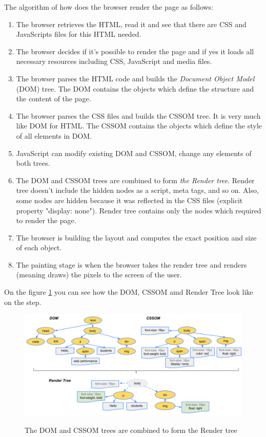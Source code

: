 The algorithm of how does the browser render the page as follows:

\begin{enumerate}
    \item The browser retrieves the HTML, read it and see that there are CSS and JavaScripts files for this HTML needed.
    \item The browser decides if it's possible to render the page and if yes it loads all necessary resources including CSS, JavaScript and media files.
    \item The browser parses the HTML code and builds the \textit{Document Object Model} (DOM) tree. The DOM contains the objects which define the structure and the content of the page.
    \item The browser parses the CSS files and builds the CSSOM tree. It is very much like DOM for HTML. The CSSOM contains the objects which define the style of all elements in DOM.
    \item JavaScript can modify existing DOM and CSSOM, change any elements of both trees.
    \item The DOM and CSSOM trees are combined to form \textit{the Render tree}. Render tree doesn't include the hidden nodes as a script, meta tags, and so on. Also, some nodes are hidden because it was reflected in the CSS files (explicit property "display: none"). Render tree contains only the nodes which required to render the page.
    \item The browser is building the layout and computes the exact position and size of each object.
    \item The painting stage is when the browser takes the render tree and renders (meaning draws) the pixels to the screen of the user. 
\end{enumerate}

On the figure \ref{fig:domcsstree} you can see how the DOM, CSSOM amd Render Tree look like on the  step.\\

\begin{figure}[h]
\begin{center}
\includegraphics[width=1.0\textwidth]{figures02/render-tree-construction}
\caption{The DOM and CSSOM trees are combined to form the Render tree}
\label{fig:domcsstree}
\end{center}
\end{figure}

